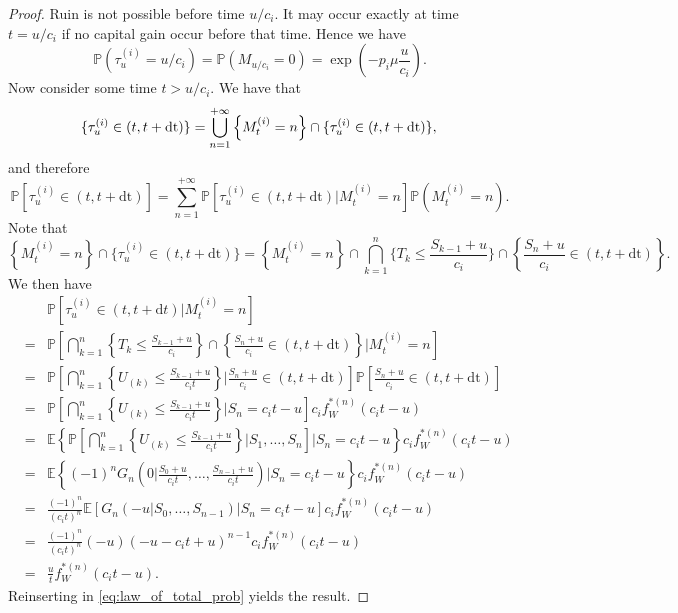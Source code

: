 \begin{proof}
Ruin is not possible before time $u/c_i$. It may occur exactly at time $t = u/c_i$ if no capital gain occur before that time. Hence we have 
$$
\mathbb{P}(\tau_u^{(i)} = u/c_i) = \mathbb{P}(M_{u/c_i} = 0) = \exp\left(-p_i\mu \frac{u}{c_i}\right).
$$
Now consider some time $t>u/c_i$. We have that 
\begin{equation*}
\{\tau_u^{(i)}\in(t,t+\text{dt})\} = \bigcup_{n = 1}^{+\infty}\left\{M_t^{(i)} = n \right\}\cap\{\tau_u^{(i)}\in(t,t+\text{dt})\},\\
\end{equation*}
and therefore
\begin{equation}\label{eq:law_of_total_prob}
\mathbb{P}\left[\tau_u^{(i)}\in(t,t+\text{dt})\right] = \sum_{n = 1}^{+\infty}\mathbb{P}\left[\tau_u^{(i)}\in(t,t+\text{dt})\big\rvert M_t^{(i)} = n\right]\mathbb{P}\left(M_t^{(i)} = n \right).
\end{equation}
Note that 
\[
\left\{M_t^{(i)} = n \right\}\cap\{\tau_u^{(i)}\in(t,t+\text{dt})\} =\left\{M_t^{(i)} = n \right\}\cap\bigcap_{k = 1}^{n}\{T_k\leq\frac{S_{k-1}+u}{c_i}\}\cap\left\{\frac{S_n+u}{c_i}\in(t,t+\text{dt})\right\}.
\]
We then have 
\begin{eqnarray*}
&&\mathbb{P}\left[\tau_u^{(i)}\in (t,t+\text{d}t)\big\rvert M_t^{(i)} = n \right]\\
&=&\mathbb{P}\left[\bigcap_{k = 1}^{n}\left\{T_k\leq\frac{S_{k-1}+u}{c_i}\right\}\cap\left\{\frac{S_n+u}{c_i}\in(t,t+\text{dt})\right\}\big\rvert M_t^{(i)} = n \right]\\
&=&\mathbb{P}\left[\bigcap_{k = 1}^{n}\left\{
U_{(k)}\leq\frac{S_{k-1}+u}{c_i t}
\right\}
\Big\rvert\frac{S_n+u}{c_i}\in(t,t+\text{dt})\right]
\mathbb{P}\left[\frac{S_n+u}{c_i}\in(t,t+\text{dt})\right]\\
&=&\mathbb{P}\left[\bigcap_{k = 1}^{n}\left\{
U_{(k)}\leq\frac{S_{k-1}+u}{c_i t}
\right\}
\Big\rvert S_{n}=c_i t -u\right]
c_i f_{W}^{\ast(n)}(c_i t -u)\\
&=&\mathbb{E}\left\{\mathbb{P}\left[\bigcap_{k = 1}^{n}\left\{
U_{(k)}\leq\frac{S_{k-1}+u}{c_i t}
\right\}\Big\rvert S_1,\ldots, S_n\right]
\Big\rvert S_{n}=c_i t -u\right\}
c_i f_{W}^{\ast(n)}(c_i t -u)\\
&=&\mathbb{E}\left\{(-1)^nG_n\left(0\Big\rvert \frac{S_0+u}{c_i t}, \ldots, \frac{S_{n-1}+u}{c_i t}\right)
\Big\rvert S_{n}=c_i t -u\right\}
c_i f_{W}^{\ast(n)}(c_i t -u)\\
&=&\frac{(-1)^n}{(c_it)^{n} }\mathbb{E}\left[G_n\left(-u\Big\rvert S_0, \ldots, S_{n-1}\right)
\Big\rvert S_{n}=c_i t -u\right]
c_i f_{W}^{\ast(n)}(c_i t -u)\\
&=&\frac{(-1)^n}{(c_it)^{n} }(-u)(-u-c_i t + u)^{n-1}
c_i f_{W}^{\ast(n)}(c_i t -u) \\
&=& \frac{u}{ t}f_{W}^{\ast(n)}(c_i t -u) .
\end{eqnarray*}
Reinserting in \eqref{eq:law_of_total_prob} yields the result.

\end{proof}
